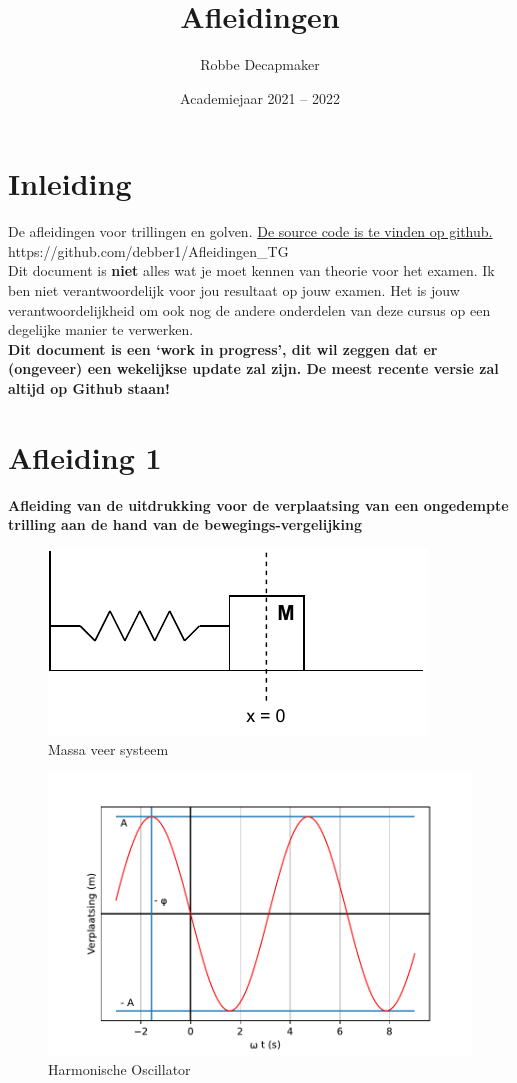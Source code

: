 \documentclass[a4paper,kul]{kulakarticle} %
\date{Academiejaar 2021 -- 2022}
\title{Afleidingen}
\author{Robbe Decapmaker}
\begin{document}
\maketitle

\section*{Inleiding}

De afleidingen voor trillingen en golven. \href{https://github.com/debber1/Afleidingen_TG}{De source code is te vinden op github.}\\
https://github.com/debber1/Afleidingen\_TG\\
Dit document is \textbf{niet} alles wat je moet kennen van theorie voor het examen. Ik ben niet verantwoordelijk voor jou resultaat op jouw examen. Het is jouw verantwoordelijkheid om ook nog de andere onderdelen van deze cursus op een degelijke manier te verwerken. \\
\textbf{Dit document is een `work in progress', dit wil zeggen dat er (ongeveer) een wekelijkse update zal zijn. De meest recente versie zal altijd op Github staan!}

\section{Afleiding 1}

\textbf{Afleiding van de uitdrukking voor de verplaatsing van een ongedempte trilling aan de hand van de bewegings-vergelijking}\\
\begin{figure}[htbp]
	\centering
	\includegraphics[width=0.4\linewidth]{MassaVeer}
	\caption[Massa veer systeem]{Massa veer systeem}
	\label{fig:massaveer}
\end{figure}
\begin{figure}[htbp]
	\centering
	\includegraphics[width=0.7\linewidth]{Harmonische_Oscillator}
	\caption[Harmonische Oscillator]{Harmonische Oscillator}
	\label{fig:harmonischeoscilator}
\end{figure}
\end{document}
